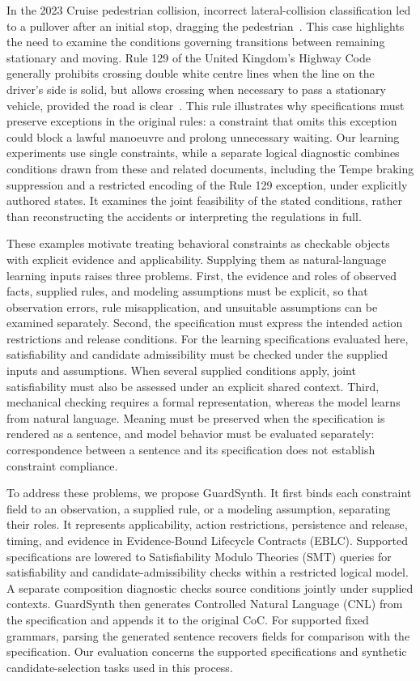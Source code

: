 In the 2023 Cruise pedestrian collision, incorrect lateral-collision
classification led to a pullover after an initial stop, dragging the
pedestrian~\cite{Cruise2023Recall23E086}. This case highlights the need to
examine the conditions governing transitions between remaining stationary and
moving. Rule 129 of the United Kingdom's Highway Code generally prohibits
crossing double white centre lines when the
line on the driver's side is solid, but allows crossing when necessary to pass
a stationary vehicle, provided the road is clear~\cite{DfT2015HighwayCode129}.
This rule illustrates why specifications must preserve exceptions in the
original rules: a constraint that omits this exception could block a lawful
manoeuvre and prolong unnecessary waiting. Our learning experiments use
single constraints, while a separate logical diagnostic combines conditions
drawn from these and related documents, including the Tempe braking
suppression and a restricted encoding of the Rule 129 exception, under
explicitly authored states. It examines the joint feasibility of the stated
conditions, rather than reconstructing the accidents or interpreting the
regulations in full.

These examples motivate treating behavioral constraints as checkable objects
with explicit evidence and applicability. Supplying them as natural-language
learning inputs raises three problems. First, the evidence and roles of
observed facts, supplied rules, and modeling assumptions must be explicit, so
that observation errors, rule misapplication, and unsuitable assumptions can
be examined separately. Second, the specification must express the intended
action restrictions and release conditions. For the learning specifications
evaluated here, satisfiability and candidate admissibility must be checked
under the supplied inputs and assumptions. When several supplied conditions apply, joint satisfiability must also be
assessed under an explicit shared context. Third, mechanical checking
requires a formal representation, whereas the model learns from natural
language. Meaning must be preserved when the specification is rendered as a
sentence, and model behavior must be evaluated separately: correspondence
between a sentence and its specification does not establish constraint compliance.

To address these problems, we propose GuardSynth. It first binds each
constraint field to an observation, a supplied rule, or a modeling assumption,
separating their roles. It represents applicability, action restrictions,
persistence and release, timing, and evidence in Evidence-Bound Lifecycle
Contracts (EBLC). Supported specifications are lowered to Satisfiability Modulo
Theories (SMT) queries for satisfiability and candidate-admissibility checks
within a restricted logical model. A separate composition diagnostic checks
source conditions jointly under supplied contexts. GuardSynth then generates Controlled Natural Language
(CNL) from the specification and appends it to the original CoC. For supported
fixed grammars, parsing the generated sentence recovers fields for comparison
with the specification. Our evaluation concerns the supported specifications
and synthetic candidate-selection tasks used in this process.

